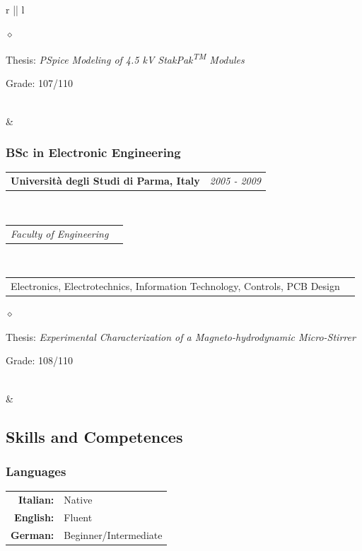\documentclass[a4paper]{article}
\makeatletter
\newlength{\sectsep}
\newlength{\subsectsep}
\newcommand{\headerrow}[2]
{\begin{tabular*}{\textwidth}{l@{\extracolsep{\fill}}r}
	#1 &
	#2 \\
\end{tabular*}}
\renewenvironment{itemize}{
  \begin{list}{$\diamond$}{
    \setlength{\topsep}{0.25em}
    \setlength{\itemsep}{0em}
    \setlength{\parskip}{0pt}
    \setlength{\parsep}{0em}
  }
}{
  \end{list}
}
\makeatother
\begin{document}
\begin{longtable}{r || l}
\begin{minipage}{0.9\textwidth}
      \begin{itemize}
          \item Thesis: \emph{PSpice Modeling of 4.5 kV StakPak\textsuperscript{TM} Modules}
          \item Grade: 107/110
      \end{itemize}
      \vfill
  \end{minipage} \\[\sectsep]

  & \begin{minipage}{0.9\textwidth}
      \vspace{\subsectsep}
      \subsubsection*{BSc in Electronic Engineering}
      \headerrow
  		{\textbf{Università degli Studi di Parma, Italy}}{\emph{2005 - 2009}}
      \\
      \headerrow
        {\emph{Faculty of Engineering}}{}
      \\
      \headerrow
        {Electronics, Electrotechnics, Information Technology, Controls, PCB Design}{}

      \begin{itemize}
          \item Thesis: \emph{Experimental Characterization of a Magneto-hydrodynamic Micro-Stirrer}
          \item Grade: 108/110
      \end{itemize}
      \vfill
  \end{minipage} \\[\sectsep]

  & \begin{minipage}{0.9\textwidth}
      \vspace{\sectsep}
      \subsection*{Skills and Competences}
      \subsubsection*{Languages}
      \begin{tabular}{rl}
        \textbf{Italian:}&Native\\
        \textbf{English:}&Fluent\\
        \textbf{German:}&Beginner/Intermediate\\
      \end{tabular} \vspace{1.5ex} \\
    \end{minipage} \\[\sectsep]


\end{longtable}
\end{document}
